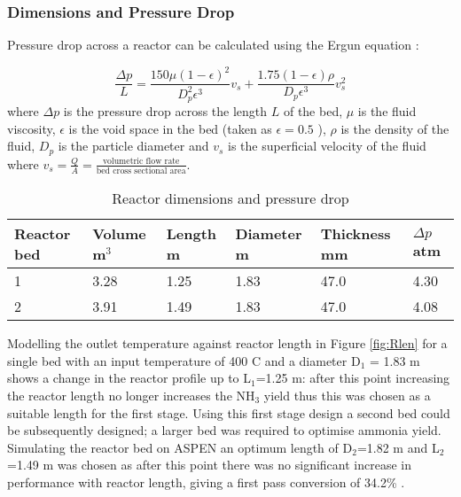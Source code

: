 \subsubsection{Dimensions and Pressure Drop}

Pressure drop across a reactor can be calculated using the Ergun equation \cite{Ergun1949}:

\begin{equation}
\frac{\Delta p}{L}= \frac{150\mu(1-\epsilon)^2}{D_p^2\epsilon ^3}v_s+\frac{1.75(1-\epsilon)\rho}{D_p\epsilon ^3}v_s^2
\end{equation}
where $\Delta p$ is the pressure drop across the length $L$ of the bed, $\mu$ is the fluid viscosity, $\epsilon$ is the void space in the bed (taken as $\epsilon = 0.5$ \cite{Ergun1949}), $\rho$ is the density of the fluid, $D_p$ is the particle diameter and $v_s$ is the superficial velocity of the fluid where $v_s = \frac{Q}{A} = \frac{\text{volumetric flow rate}}{\text{bed cross sectional area}}$.
\begin{table}[!htbp]
	\begin{center}
		\caption{Reactor dimensions and pressure drop}
		\begin{tabular}{ |p{2.3cm}|p{2.3cm}|p{2.3cm}|p{2.3cm}|p{2.7cm}|p{2.3cm}| }
			\hline
			
			Reactor bed & Volume m$^3$& Length m&Diameter m&Thickness mm&$\Delta p$ atm\\
			\hline
			1&3.28 & 1.25 &1.83 &47.0& 4.30\\
			\hline
			2&3.91 & 1.49 &1.83 &47.0&4.08\\
			
			\hline
		\end{tabular}
	\end{center}
\end{table}


Modelling the outlet temperature against reactor length in Figure \ref{fig:Rlen} for a single bed with an input temperature of 400 \textdegree C and a diameter D$_1$ = 1.83 m shows a change in the reactor profile up to L$_1$=1.25 m: after this point increasing the reactor length no longer increases the NH$_3$ yield thus this was chosen as a suitable length for the first stage. Using this first stage design a second bed could be subsequently designed; a larger bed was required to optimise ammonia yield. Simulating the reactor bed on ASPEN an optimum length of D$_2$=1.82 m and L$_2$=1.49 m was chosen as after this point there was no significant increase in performance with reactor length, giving a first pass conversion of 34.2\% \cite{Elnashaie1989}.

